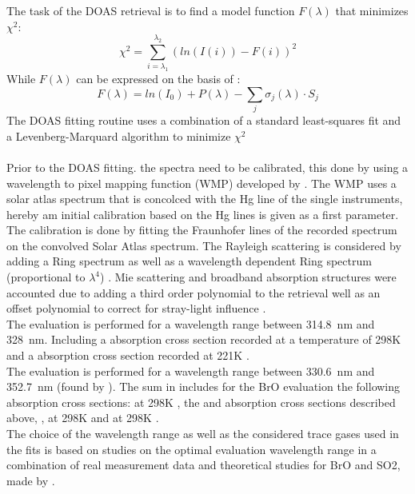 The task of the DOAS retrieval is to find a model function $F \left(\lambda\right)$ that minimizes $\chi^2$:
\begin{equation}
\chi^2 = \sum_{i=\lambda_1}^{\lambda_2}\left(ln(I(i))-F(i)\right)^2
\label{eq:Chi}
\end{equation}
While $F\left(\lambda\right)$ can be expressed on the basis of :
\begin{equation}
F\left(\lambda\right) = ln\left(I_0 \right) + P \left(\lambda\right)-
\sum_{j}\sigma_j \left(\lambda\right) \cdot S_j
\label{eq:F}
\end{equation}
The DOAS fitting routine uses a combination of a standard least-squares fit and a Levenberg-Marquard algorithm to minimize $\chi^2$\\
\\
Prior to the DOAS fitting. the spectra need to be calibrated, this done by using a wavelength to pixel mapping function (WMP) developed by \citet{lehman 2014}. The WMP uses a solar atlas spectrum that is concolced with the Hg line of the single instruments, hereby am initial calibration based on the Hg lines is given as a first parameter. The calibration is done by fitting the Fraunhofer lines of the recorded spectrum on the convolved Solar Atlas spectrum. The Rayleigh scattering is considered by adding a Ring spectrum as well as a wavelength dependent Ring spectrum (proportional to $\lambda^4$) \citep{wagner2009}. Mie scattering and broadband absorption structures were accounted due to adding a third order polynomial to the retrieval well as an offset polynomial to correct for stray-light influence \citep{lubcke2014bro}.\\
The  evaluation is performed for a wavelength range between 314.8~nm and 328~nm. Including a  absorption cross section recorded at a temperature of 298K \citep{vandaele2009fourier} and a   absorption cross section recorded at 221K \citep{burrows1999atmospheric}.\\
The   evaluation is performed for a wavelength range between 330.6~nm and 352.7~nm (found by \citet{vogel2011volcanic}). The sum in  includes for the BrO evaluation the following absorption cross sections:
  at 298K \citep{fleischmann2004new}, the  and   absorption cross sections described above,  \citep{hermans2003absorption},   at 298K \citep{vandaele1998measurements} and   at 298K \citep{meller2000temperature}.\\
%
The choice of the wavelength range as well as the considered trace gases used in the fits is based on studies on the optimal evaluation wavelength range in a combination of real measurement data and theoretical studies for BrO and SO2, made by \citet{vogel2011volcanic}.\\
